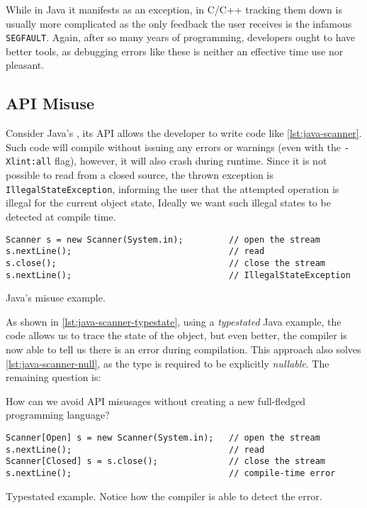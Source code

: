 While in Java it manifests as an exception,
in C/C++ tracking them down is usually more complicated as the only feedback the user receives is the infamous \texttt{SEGFAULT}.
Again, after so many years of programming, developers ought to have better tools,
as debugging errors like these is neither an effective time use nor pleasant.

\subsection{API Misuse}

Consider Java's , its API allows the developer to write code like \autoref{lst:java-scanner}.
Such code will compile without issuing any errors or warnings (even with the \texttt{-Xlint:all} flag),
however, it will also crash during runtime.
Since it is not possible to read from a closed source, the thrown exception is \texttt{IllegalStateException},
informing the user that the attempted operation is illegal for the current object state,
Ideally we want such illegal states to be detected at compile time.

\begin{listing}
    \begin{verbatim}
Scanner s = new Scanner(System.in);         // open the stream
s.nextLine();                               // read
s.close();                                  // close the stream
s.nextLine();                               // IllegalStateException
    \end{verbatim}
    \caption{Java's  misuse example.}
    \label{lst:java-scanner}
\end{listing}

As shown in \autoref{lst:java-scanner-typestate}, using a \emph{typestated} Java example,
the code allows us to trace the state of the object, but even better,
the compiler is now able to tell us there is an error during compilation.
This approach also solves \autoref{lst:java-scanner-null}, as the type is required to be explicitly \emph{nullable}.
The remaining question is:
\begin{displayquote}
    How can we avoid API misusages without creating a new full-fledged programming language?
\end{displayquote}

\begin{listing}
    \begin{verbatim}
Scanner[Open] s = new Scanner(System.in);   // open the stream
s.nextLine();                               // read
Scanner[Closed] s = s.close();              // close the stream
s.nextLine();                               // compile-time error
    \end{verbatim}
    \caption{
        Typestated  example.
        Notice how the compiler is able to detect the error.
    }
    \label{lst:java-scanner-typestate}
\end{listing}

